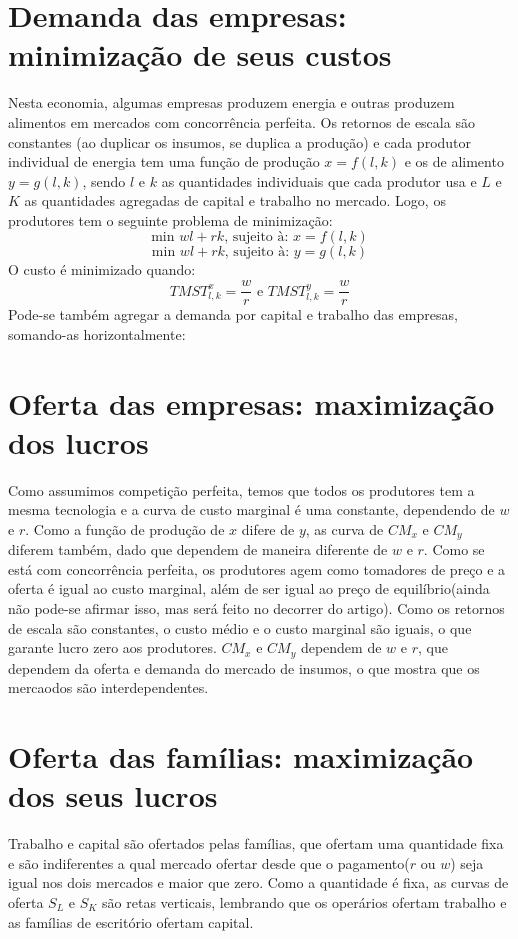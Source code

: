 \documentclass[oneside,12pt, letterpaper]{book}
\begin{document}
{{{\section{Demanda das empresas: minimiza{\c c}{\~a}o de seus custos}
Nesta economia, algumas empresas produzem energia e outras produzem alimentos em mercados com concorr{\^e}ncia perfeita. Os retornos de escala s{\~a}o constantes (ao
duplicar os insumos, se duplica a produ{\c c}{\~a}o) e cada produtor individual de energia tem uma fun{\c c}{\~a}o  de produ{\c c}{\~a}o $x = f(l, k)$ e os de alimento $y = g(l, k)$, sendo $l$ e $k$ as quantidades individuais	
que cada produtor usa e $L$ e $K$ as quantidades agregadas de capital e trabalho no mercado. Logo, os produtores tem o seguinte problema de minimiza{\c c}{\~a}o:
\[ \text{min }wl+rk  \text{, sujeito {\`a}: }x=f(l,k)  \]
\[ \text{min }wl+rk  \text{, sujeito {\`a}: }y=g(l,k)  \]
O custo {\'e} minimizado quando: \[ TMST^x_{l,k} = \frac{w}{r} \text{   e   } TMST^y_{l,k} = \frac{w}{r} \]
Pode-se tamb{\'e}m agregar a demanda por capital e trabalho das empresas, somando-as horizontalmente: 
\section{Oferta das empresas: maximização dos lucros} 
Como assumimos competição perfeita, temos que todos os produtores tem a mesma tecnologia e a curva de custo marginal é uma constante, dependendo de $w$ e $r$. 
Como a função de produção de $x$ difere de $y$, as curva de $CM_x$ e $CM_y$ diferem também, dado que dependem de maneira diferente de $w$ e $r$. Como se
está com concorrência perfeita, os produtores agem como tomadores de preço e a oferta é igual ao custo marginal, além de ser igual ao preço de equilíbrio(ainda não 
pode-se afirmar isso, mas será feito no decorrer do artigo). 
Como os retornos de escala são constantes, o custo médio e o custo marginal são iguais, o que garante lucro zero aos produtores. $CM_x$ e $CM_y$ dependem de
$w$ e $r$, que dependem da oferta e demanda do mercado de insumos, o que mostra que os mercaodos são interdependentes.
\section{Oferta das famílias: maximização dos seus lucros}
Trabalho e capital são ofertados pelas famílias, que ofertam uma quantidade fixa e são indiferentes a qual mercado ofertar desde que o pagamento($r$ ou $w$) seja 
igual nos dois mercados e maior que zero. Como a quantidade é fixa, as curvas de oferta $S_L$ e $S_K$ são retas verticais, lembrando que os operários ofertam trabalho
e as famílias de escritório ofertam capital. 
}}}
\end{document}
